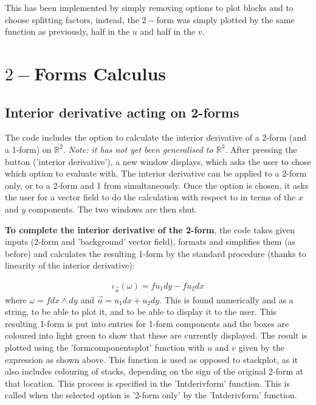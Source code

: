 \documentclass[12pt]{report}
\begin{document}
This has been implemented by simply removing options to plot blocks and to choose splitting factors, instead, the $2-$form was simply plotted by the same function as previously, half in the $u$ and half in the $v$.

\chapter {$2-$Forms Calculus}
\section{Interior derivative acting on 2-forms}
The code includes the option to calculate the interior derivative of a 2-form (and a 1-form) on $\mathbb{R}^{2}$. \textit{Note: it has not yet been generalised to $\mathbb{R}^{3}$}. After pressing the button ('interior derivative'), a new window displays, which asks the user to chose which option to evaluate with. The interior derivative can be applied to a 2-form only, or to a 2-form and 1 from simultaneously. Once the option is chosen, it asks the user for a vector field to do the calculation with respect to in terms of the $x$ and $y$ components. The two windows are then shut.

\noindent \textbf{To complete the interior derivative of the 2-form}, the code takes given inputs (2-form and 'background' vector field), formats and simplifies them (as before) and calculates the resulting 1-form by the standard procedure (thanks to linearity of the interior derivative):

\begin{equation}
	\label{T2} \begin{split}
		\iota_{\vec{u}}(\omega) = f u_{1} dy - f u_{2} dx
	\end{split}
\end{equation}
where $\omega = f dx\wedge dy$ and $\vec{u} = u_{1}dx + u_{2}dy$.
This is found numerically and as a string, to be able to plot it, and to be able to display it to the user.
This resulting 1-form is put into entries for 1-form components and the boxes are coloured into light green to show that these are currently displayed. The result is plotted using the 'form\textunderscore components\textunderscore plot' function with $u$ and $v$ given by the expression as shown above. This function is used as opposed to stack\textunderscore plot, as it also includes colouring of stacks, depending on the sign of the original 2-form at that location.
This process is specified in the 'Int\textunderscore deriv\textunderscore form' function. This is called when the selected option is '2-form only' by the 'Int\textunderscore deriv\textunderscore form' function.
\end{document}
